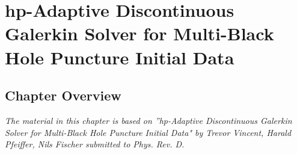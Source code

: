 \chapter{hp-Adaptive Discontinuous Galerkin Solver for Multi-Black Hole Puncture Initial Data}

\section{Chapter Overview}

\textit{The material in this chapter is based on ”hp-Adaptive Discontinuous Galerkin Solver for Multi-Black Hole Puncture Initial Data" by Trevor Vincent, Harald Pfeiffer, Nils Fischer submitted to Phys. Rev. D.}
